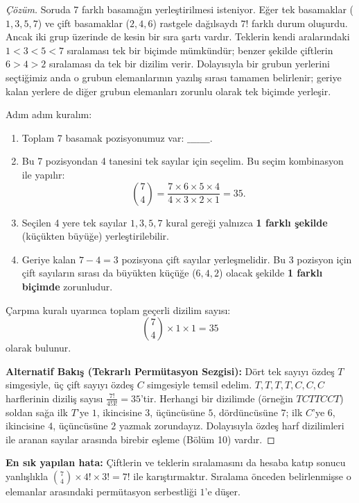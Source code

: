 \begin{proof}[Çözüm]
Soruda 7 farklı basamağın yerleştirilmesi isteniyor. Eğer tek basamaklar ($1, 3, 5, 7$) ve çift basamaklar ($2, 4, 6$) rastgele dağılsaydı $7!$ farklı durum oluşurdu. Ancak iki grup üzerinde de kesin bir sıra şartı vardır. Teklerin kendi aralarındaki $1 < 3 < 5 < 7$ sıralaması tek bir biçimde mümkündür; benzer şekilde çiftlerin $6 > 4 > 2$ sıralaması da tek bir dizilim verir. Dolayısıyla bir grubun yerlerini seçtiğimiz anda o grubun elemanlarının yazılış sırası tamamen belirlenir; geriye kalan yerlere de diğer grubun elemanları zorunlu olarak tek biçimde yerleşir.

Adım adım kuralım:
\begin{enumerate}
    \item Toplam 7 basamak pozisyonumuz var: $\_ \_ \_ \_ \_ \_ \_$.
    \item Bu 7 pozisyondan 4 tanesini tek sayılar için seçelim. Bu seçim kombinasyon ile yapılır:
    \[
    \binom{7}{4} = \frac{7 \times 6 \times 5 \times 4}{4 \times 3 \times 2 \times 1} = 35.
    \]
    \item Seçilen 4 yere tek sayılar $1, 3, 5, 7$ kural gereği yalnızca \textbf{1 farklı şekilde} (küçükten büyüğe) yerleştirilebilir.
    \item Geriye kalan $7 - 4 = 3$ pozisyona çift sayılar yerleşmelidir. Bu 3 pozisyon için çift sayıların sırası da büyükten küçüğe ($6, 4, 2$) olacak şekilde \textbf{1 farklı biçimde} zorunludur.
\end{enumerate}

Çarpma kuralı uyarınca toplam geçerli dizilim sayısı:
\[
\binom{7}{4} \times 1 \times 1 = 35
\]
olarak bulunur.

\textbf{Alternatif Bakış (Tekrarlı Permütasyon Sezgisi):}
Dört tek sayıyı özdeş $T$ simgesiyle, üç çift sayıyı özdeş $C$ simgesiyle temsil edelim. $T, T, T, T, C, C, C$ harflerinin diziliş sayısı $\frac{7!}{4!3!} = 35$'tir. Herhangi bir dizilimde (örneğin $T C T T C C T$) soldan sağa ilk $T$'ye $1$, ikincisine $3$, üçüncüsüne $5$, dördüncüsüne $7$; ilk $C$'ye $6$, ikincisine $4$, üçüncüsüne $2$ yazmak zorundayız. Dolayısıyla özdeş harf dizilimleri ile aranan sayılar arasında birebir eşleme (Bölüm 10) vardır.
\end{proof}

\textbf{En sık yapılan hata:} Çiftlerin ve teklerin sıralamasını da hesaba katıp sonucu yanlışlıkla $\binom{7}{4} \times 4! \times 3! = 7!$ ile karıştırmaktır. Sıralama önceden belirlenmişse o elemanlar arasındaki permütasyon serbestliği $1$'e düşer.

